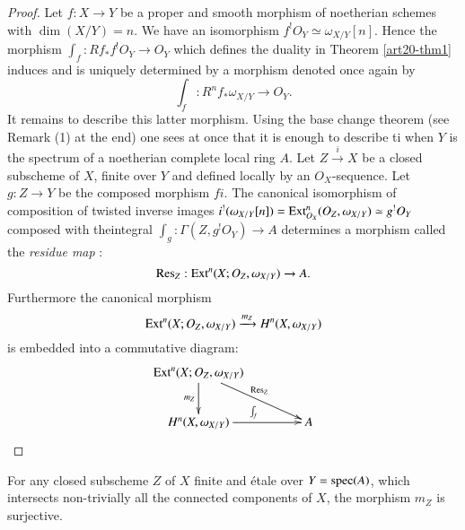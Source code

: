 \begin{proof}
Let $f:X\to Y$ be a proper and smooth morphism of noetherian schemes with $\dim(X/Y)=n$. We have an isomorphism $f^{!}O_{Y}\simeq \omega_{X/Y}[n]$. Hence the morphism $\int_{f}:Rf_{*}f^{!}O_{Y}\to O_{Y}$ which defines the duality in Theorem \ref{art20-thm1} induces and is uniquely determined by a morphism denoted once again by
$$
\int_{f}:R^{n}f_{*}\omega_{X/Y}\to O_{Y}.
$$
It remains to describe this latter morphism. Using the base change theorem (see Remark (1) at the end) one sees at once that it is enough to describe ti when $Y$ is the spectrum of a noetherian complete local ring $A$. Let $Z\xrightarrow{i}X$ be a closed subscheme of $X$, finite over $Y$ and defined locally by an $O_{X}$-sequence. Let $g:Z\to Y$ be the composed morphism $fi$. The canonical isomorphism of composition of twisted inverse images $i^{!}(\omega_{X/Y}[n])=\operatorname{\mathrm{Ext}}_{O_{X}}^{n}(O_{Z},\omega_{X/Y})\simeq g^{!}O_{Y}$ composed with the\pageoriginale integral $\int_{g}:\Gamma(Z,g^{!}O_{Y})\to A$ determines a morphism called the {\em residue map} :
$$
\operatorname{\mathrm{Res}}_{Z}:\operatorname{\mathrm{Ext}}^{n}(X;O_{Z},\omega_{X/Y})\to A.
$$
Furthermore the canonical morphism
$$
\operatorname{\mathrm{Ext}}^{n}(X;O_{Z},\omega_{X/Y})\xrightarrow{m_{Z}}H^{n}(X,\omega_{X/Y})
$$
is embedded into a commutative diagram:
\[
\xymatrix@C=1.5cm{
\Ext^{n}(X;O_{Z},\omega_{X/Y})\ar[d]_-{m_{Z}}\ar[dr]^{\Res_{Z}} & \\
H^{n}(X,\omega_{X/Y})\ar[r]^{\int_{f}} & A
}
\]
\end{proof}

\begin{proposition}\label{art20-prop2}
For any closed subscheme $Z$ of $X$ finite and \'etale over $Y=\operatorname{\mathrm{spec}} (A)$, which intersects non-trivially all the connected components of $X$, the morphism $m_{Z}$ is surjective.
\end{proposition}

